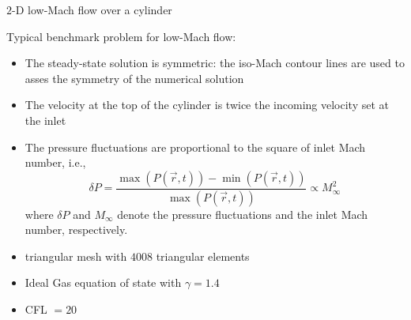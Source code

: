 \documentclass[xcolor=dvipsnames,10pt]{beamer}
\begin{document}
\begin{frame}{$2$-D low-Mach flow over a cylinder}
\begin{block}{Typical benchmark problem for low-Mach flow:}
\begin{itemize}
\item The steady-state solution is symmetric: the iso-Mach contour lines are used to asses the symmetry of the numerical solution
\item The velocity at the top of the cylinder is twice the incoming velocity set at the inlet
\item The pressure fluctuations are proportional to the square of inlet Mach number, i.e., 
\begin{equation}
\delta P = \frac{\max(P(\vec{r},t)) - \min(P(\vec{r},t))}{\max(P(\vec{r},t))}  \propto M_\infty^2 \nonumber
\end{equation}
where $\delta P$ and $M_\infty$ denote the pressure fluctuations and the inlet Mach number, respectively.
\end{itemize}
\end{block}
\begin{block}{}
\begin{itemize}
\item triangular mesh with $4008$ triangular elements
\item Ideal Gas equation of state with $\gamma = 1.4$
\item CFL $= 20$
\end{itemize}
\end{block}
\end{frame}
\end{document}
